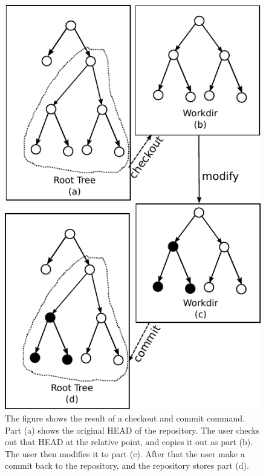 \begin{figure}[t]
\centerline{\includegraphics{fig/checkoutcommit.pdf}}
\caption{The figure shows the result of a checkout and commit command.
Part (a) shows the original HEAD of the repository. The user checks out that
HEAD at the relative point, and copies it out as part (b). The user then
modifies it to part (c). After that the user make a commit back to the
repository, and the repository stores part (d).
}

\label{f:checkout-commit}
\end{figure}

\endinput


